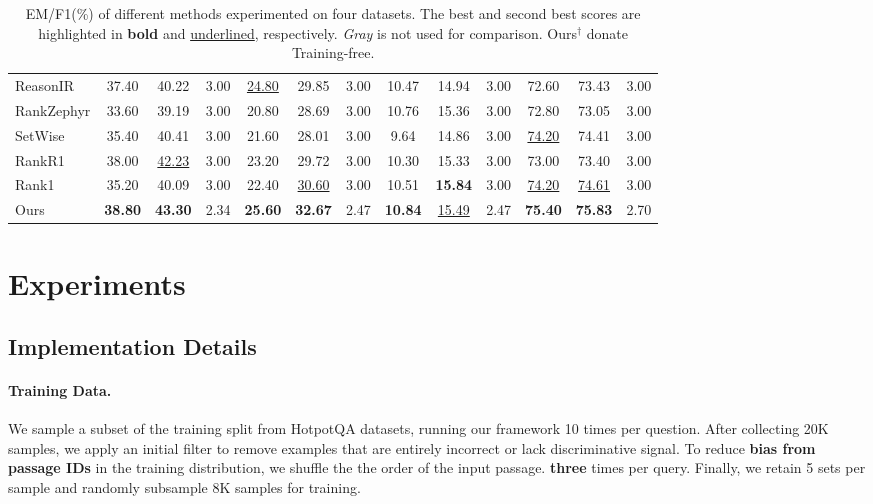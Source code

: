\documentclass[11pt]{article}
\begin{document}
\begin{table}[!ht]
{\begin{tabular}{l ccc ccc ccc ccc}
ReasonIR        & 37.40 & 40.22 & 3.00 & \underline{24.80} & 29.85 & 3.00 & 10.47 & 14.94 & 3.00 & 72.60 & 73.43 & 3.00 \\
RankZephyr      & 33.60 & 39.19 & 3.00 & 20.80 & 28.69 & 3.00 & 10.76 & 15.36 & 3.00 & 72.80 & 73.05 & 3.00 \\
SetWise         & 35.40 & 40.41 & 3.00 & 21.60 & 28.01 & 3.00 & 9.64  & 14.86 & 3.00 & \underline{74.20} & 74.41 & 3.00 \\
RankR1          & 38.00 & \underline{42.23} & 3.00 & 23.20 & 29.72 & 3.00 & 10.30 & 15.33 & 3.00 & 73.00 & 73.40 & 3.00 \\
Rank1           & 35.20 & 40.09 & 3.00 & 22.40 & \underline{30.60} & 3.00 & 10.51 & \textbf{15.84} & 3.00 & \underline{74.20} & \underline{74.61} & 3.00 \\
Ours & \textbf{38.80} & \textbf{43.30} & 2.34 & \textbf{25.60} & \textbf{32.67} & 2.47 & \textbf{10.84} & \underline{15.49} & 2.47 & \textbf{75.40} & \textbf{75.83} & 2.70 \\ 
\bottomrule
\end{tabular}
}
\caption{EM/F1(\%) of different methods experimented on four datasets. The best and second best scores are highlighted in \textbf{bold} and \underline{underlined}, respectively. {\color[HTML]{999999}\textit{Gray}} is not used for comparison. Ours$^\dagger$ donate Training-free.}
\label{tab:main}
\end{table}

\section{Experiments}

\subsection{Implementation Details}
\paragraph{Training Data.} 
We sample a subset of the training split from HotpotQA datasets, running our framework 10 times per question. After collecting 20K samples, we apply an initial filter to remove examples that are entirely incorrect or lack discriminative signal. To reduce \textbf{bias from passage IDs} in the training distribution, we shuffle the the order of the input passage. \textbf{three} times per query. Finally, we retain 5 sets per sample and randomly subsample 8K samples for training. 
\end{document}
